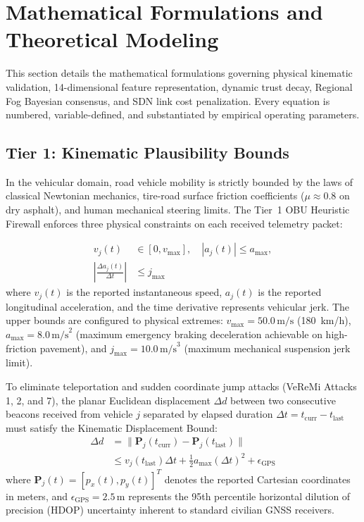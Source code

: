 \documentclass[conference]{IEEEtran}
\begin{document}
\section{Mathematical Formulations and Theoretical Modeling}

This section details the mathematical formulations governing physical kinematic validation, 14-dimensional feature representation, dynamic trust decay, Regional Fog Bayesian consensus, and SDN link cost penalization. Every equation is numbered, variable-defined, and substantiated by empirical operating parameters.

\subsection{Tier 1: Kinematic Plausibility Bounds}

In the vehicular domain, road vehicle mobility is strictly bounded by the laws of classical Newtonian mechanics, tire-road surface friction coefficients ($\mu \approx 0.8$ on dry asphalt), and human mechanical steering limits. The Tier~1 OBU Heuristic Firewall enforces three physical constraints on each received telemetry packet:

\begin{equation}
\begin{aligned}
v_j(t) &\in [0, v_{\text{max}}], \quad |a_j(t)| \le a_{\text{max}}, \\
\left|\frac{\Delta a_j(t)}{\Delta t}\right| &\le j_{\text{max}}
\end{aligned}
\label{eq:kin_bounds}
\end{equation}
where $v_j(t)$ is the reported instantaneous speed, $a_j(t)$ is the reported longitudinal acceleration, and the time derivative represents vehicular jerk. The upper bounds are configured to physical extremes: $v_{\text{max}} = 50.0\,\text{m/s}$ (180~km/h), $a_{\text{max}} = 8.0\,\text{m/s}^2$ (maximum emergency braking deceleration achievable on high-friction pavement), and $j_{\text{max}} = 10.0\,\text{m/s}^3$ (maximum mechanical suspension jerk limit).

To eliminate teleportation and sudden coordinate jump attacks (VeReMi Attacks 1, 2, and 7), the planar Euclidean displacement $\Delta d$ between two consecutive beacons received from vehicle $j$ separated by elapsed duration $\Delta t = t_{\text{curr}} - t_{\text{last}}$ must satisfy the Kinematic Displacement Bound:
\begin{equation}
\begin{aligned}
\Delta d &= \|\mathbf{P}_j(t_{\text{curr}}) - \mathbf{P}_j(t_{\text{last}})\| \\
&\le v_j(t_{\text{last}})\Delta t + \frac{1}{2}a_{\text{max}}(\Delta t)^2 + \epsilon_{\text{GPS}}
\end{aligned}
\label{eq:disp_bound}
\end{equation}
where $\mathbf{P}_j(t) = [p_x(t), p_y(t)]^T$ denotes the reported Cartesian coordinates in meters, and $\epsilon_{\text{GPS}} = 2.5\,\text{m}$ represents the 95th percentile horizontal dilution of precision (HDOP) uncertainty inherent to standard civilian GNSS receivers.
\end{document}
